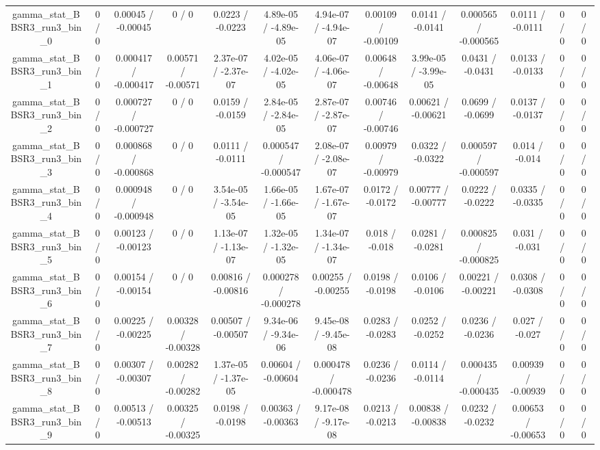 \documentclass[10pt]{article}
\begin{document}
\begin{table}[htbp]
\begin{center}
\begin{tabular}{|c|c|c|c|c|c|c|c|c|c|c|c|c|}
  gamma_stat_BBSR3_run3_bin_0 & 0 / 0 & 0.00045 / -0.00045 & 0 / 0 & 0.0223 / -0.0223 & 4.89e-05 / -4.89e-05 & 4.94e-07 / -4.94e-07 & 0.00109 / -0.00109 & 0.0141 / -0.0141 & 0.000565 / -0.000565 & 0.0111 / -0.0111 & 0 / 0 & 0 / 0 \\ 
  gamma_stat_BBSR3_run3_bin_1 & 0 / 0 & 0.000417 / -0.000417 & 0.00571 / -0.00571 & 2.37e-07 / -2.37e-07 & 4.02e-05 / -4.02e-05 & 4.06e-07 / -4.06e-07 & 0.00648 / -0.00648 & 3.99e-05 / -3.99e-05 & 0.0431 / -0.0431 & 0.0133 / -0.0133 & 0 / 0 & 0 / 0 \\ 
  gamma_stat_BBSR3_run3_bin_2 & 0 / 0 & 0.000727 / -0.000727 & 0 / 0 & 0.0159 / -0.0159 & 2.84e-05 / -2.84e-05 & 2.87e-07 / -2.87e-07 & 0.00746 / -0.00746 & 0.00621 / -0.00621 & 0.0699 / -0.0699 & 0.0137 / -0.0137 & 0 / 0 & 0 / 0 \\ 
  gamma_stat_BBSR3_run3_bin_3 & 0 / 0 & 0.000868 / -0.000868 & 0 / 0 & 0.0111 / -0.0111 & 0.000547 / -0.000547 & 2.08e-07 / -2.08e-07 & 0.00979 / -0.00979 & 0.0322 / -0.0322 & 0.000597 / -0.000597 & 0.014 / -0.014 & 0 / 0 & 0 / 0 \\ 
  gamma_stat_BBSR3_run3_bin_4 & 0 / 0 & 0.000948 / -0.000948 & 0 / 0 & 3.54e-05 / -3.54e-05 & 1.66e-05 / -1.66e-05 & 1.67e-07 / -1.67e-07 & 0.0172 / -0.0172 & 0.00777 / -0.00777 & 0.0222 / -0.0222 & 0.0335 / -0.0335 & 0 / 0 & 0 / 0 \\ 
  gamma_stat_BBSR3_run3_bin_5 & 0 / 0 & 0.00123 / -0.00123 & 0 / 0 & 1.13e-07 / -1.13e-07 & 1.32e-05 / -1.32e-05 & 1.34e-07 / -1.34e-07 & 0.018 / -0.018 & 0.0281 / -0.0281 & 0.000825 / -0.000825 & 0.031 / -0.031 & 0 / 0 & 0 / 0 \\ 
  gamma_stat_BBSR3_run3_bin_6 & 0 / 0 & 0.00154 / -0.00154 & 0 / 0 & 0.00816 / -0.00816 & 0.000278 / -0.000278 & 0.00255 / -0.00255 & 0.0198 / -0.0198 & 0.0106 / -0.0106 & 0.00221 / -0.00221 & 0.0308 / -0.0308 & 0 / 0 & 0 / 0 \\ 
  gamma_stat_BBSR3_run3_bin_7 & 0 / 0 & 0.00225 / -0.00225 & 0.00328 / -0.00328 & 0.00507 / -0.00507 & 9.34e-06 / -9.34e-06 & 9.45e-08 / -9.45e-08 & 0.0283 / -0.0283 & 0.0252 / -0.0252 & 0.0236 / -0.0236 & 0.027 / -0.027 & 0 / 0 & 0 / 0 \\ 
  gamma_stat_BBSR3_run3_bin_8 & 0 / 0 & 0.00307 / -0.00307 & 0.00282 / -0.00282 & 1.37e-05 / -1.37e-05 & 0.00604 / -0.00604 & 0.000478 / -0.000478 & 0.0236 / -0.0236 & 0.0114 / -0.0114 & 0.000435 / -0.000435 & 0.00939 / -0.00939 & 0 / 0 & 0 / 0 \\ 
  gamma_stat_BBSR3_run3_bin_9 & 0 / 0 & 0.00513 / -0.00513 & 0.00325 / -0.00325 & 0.0198 / -0.0198 & 0.00363 / -0.00363 & 9.17e-08 / -9.17e-08 & 0.0213 / -0.0213 & 0.00838 / -0.00838 & 0.0232 / -0.0232 & 0.00653 / -0.00653 & 0 / 0 & 0 / 0 \\ 

\end{tabular}
\end{center}
\end{table}
\end{document}

